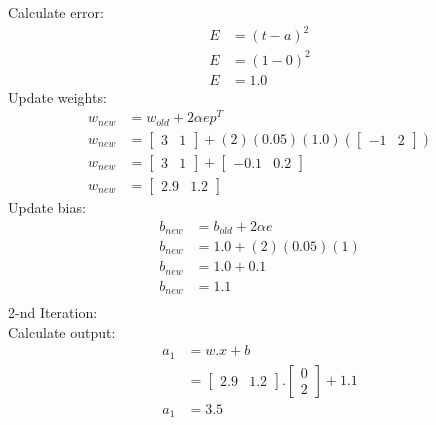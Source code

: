 \documentclass{article}
\begin{document}
	Calculate error: 
	\begin{equation}
		\begin{split}
			E & = (t - a)^2 \\
			E & = (1 - 0)^2 \\
			E & = 1.0
		\end{split}
	\end{equation}
	Update weights:
	\begin{equation}
		\begin{split}
			w_{new} & = w_{old} + 2 \alpha e p^T \\
			w_{new} & = \begin{bmatrix}
				3 & 1
			\end{bmatrix} + (2)(0.05)(1.0) (\begin{bmatrix}
			-1 & 2
		\end{bmatrix}) \\
			w_{new} & = \begin{bmatrix}
				3 & 1
			\end{bmatrix} + \begin{bmatrix}
			-0.1 & 0.2
		\end{bmatrix} \\
			w_{new} & = \begin{bmatrix}
				2.9 & 1.2
			\end{bmatrix}
		\end{split}
	\end{equation}
	Update bias:
	\begin{equation}
		\begin{split}
			b_{new} & = b_{old} + 2 \alpha e \\
			b_{new} & = 1.0 + (2)(0.05)(1) \\
			b_{new} & = 1.0 + 0.1 \\
			b_{new} & = 1.1 \\
		\end{split}
	\end{equation}
	2-nd Iteration: \\
	Calculate output: 
	\begin{equation}
		\begin{split}
			a_1 & = w.x+b \\
			& = \begin{bmatrix}
				2.9 & 1.2
			\end{bmatrix}. \begin{bmatrix}
				0 \\ 2
			\end{bmatrix} + 1.1 \\
			a_1 & = 3.5
		\end{split}
	\end{equation}
\end{document}
